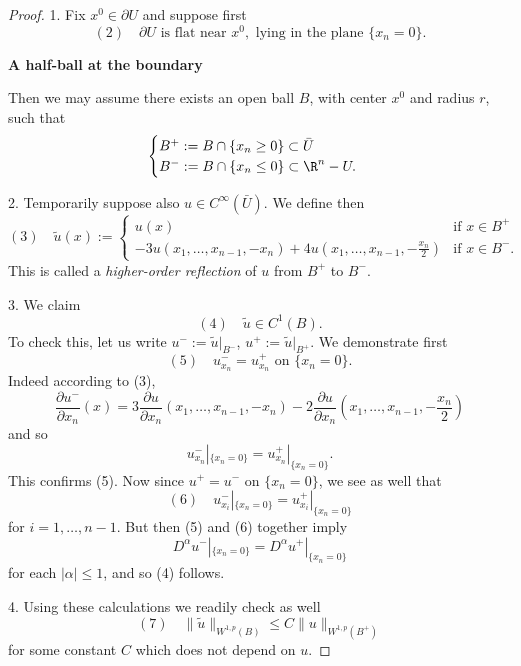 \begin{proof}
1. Fix $x^0 \in \partial U$ and suppose first
$$(2) \quad \partial U \text{ is flat near } x^0, \text{ lying in the plane } \{x_n = 0\}.$$

\begin{figure}[h]\centering
\end{figure}

\textbf{A half-ball at the boundary}

Then we may assume there exists an open ball $B$, with center $x^0$ and radius $r$, such that
$$\begin{cases}
B^+ := B \cap \{x_n \ge 0\} \subset \bar{U} \\
B^- := B \cap \{x_n \le 0\} \subset \R^n - U.
\end{cases}$$

2. Temporarily suppose also $u \in C^\infty(\bar{U})$. We define then
$$(3) \quad \tilde{u}(x) := \begin{cases}
u(x) & \text{if } x \in B^+ \\
-3u(x_1, \ldots, x_{n-1}, -x_n) + 4u(x_1, \ldots, x_{n-1}, -\frac{x_n}{2}) & \text{if } x \in B^-.
\end{cases}$$
This is called a \textit{higher-order reflection} of $u$ from $B^+$ to $B^-$.

3. We claim
$$(4) \quad \tilde{u} \in C^1(B).$$
To check this, let us write $u^- := \tilde{u}|_{B^-}$, $u^+ := \tilde{u}|_{B^+}$. We demonstrate first
$$(5) \quad u^-_{x_n} = u^+_{x_n} \text{ on } \{x_n = 0\}.$$
Indeed according to (3),
$$\frac{\partial u^-}{\partial x_n}(x) = 3\frac{\partial u}{\partial x_n}(x_1, \ldots, x_{n-1}, -x_n) - 2\frac{\partial u}{\partial x_n}(x_1, \ldots, x_{n-1}, -\frac{x_n}{2})$$
and so
$$u^-_{x_n}|_{\{x_n=0\}} = u^+_{x_n}|_{\{x_n=0\}}.$$
This confirms (5). Now since $u^+ = u^-$ on $\{x_n = 0\}$, we see as well that
$$(6) \quad u^-_{x_i}|_{\{x_n=0\}} = u^+_{x_i}|_{\{x_n=0\}}$$
for $i = 1, \ldots, n-1$. But then (5) and (6) together imply
$$D^\alpha u^-|_{\{x_n=0\}} = D^\alpha u^+|_{\{x_n=0\}}$$
for each $|\alpha| \le 1$, and so (4) follows.

4. Using these calculations we readily check as well
$$(7) \quad \|\tilde u\|_{W^{1,p}(B)} \le C\|u\|_{W^{1,p}(B^+)}$$
for some constant $C$ which does not depend on $u$.


\end{proof}
